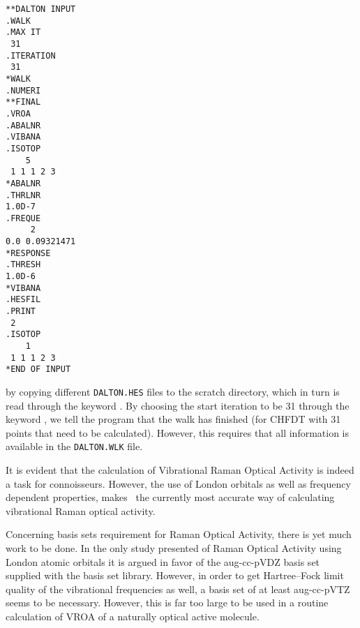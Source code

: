 \begin{verbatim}
**DALTON INPUT
.WALK
.MAX IT
 31
.ITERATION
 31
*WALK
.NUMERI
**FINAL
.VROA
.ABALNR
.VIBANA
.ISOTOP
    5
 1 1 1 2 3
*ABALNR
.THRLNR
1.0D-7
.FREQUE
     2
0.0 0.09321471
*RESPONSE
.THRESH
1.0D-6
*VIBANA
.HESFIL
.PRINT
 2
.ISOTOP
    1
 1 1 1 2 3
*END OF INPUT
\end{verbatim}
by copying different \verb|DALTON.HES| files to the scratch
directory, which in turn is read through the keyword . By
choosing the start iteration to be 31 through the keyword
, we tell the program that the walk has finished (for
CHFDT with 31 points that need to be calculated). However, this
requires that all information is available in the \verb|DALTON.WLK|
file.

It is evident that the calculation of Vibrational Raman Optical
Activity is indeed a task for
connoisseurs. However, the use of London 
orbitals as well as frequency dependent properties, makes \siraba\ the
currently most accurate way of calculating vibrational Raman optical activity. 

Concerning basis sets requirement for Raman Optical Activity, 
there is yet much work to be done. In the only study
presented of Raman Optical Activity using London atomic orbitals it is
argued in favor of the aug-cc-pVDZ basis set supplied with the basis
set library. However, in order to get Hartree--Fock limit quality of
the vibrational frequencies as well, a basis set of at least
aug-cc-pVTZ seems to be necessary. However, this is far too large to
be used in a routine calculation of VROA of a naturally optical active molecule.
